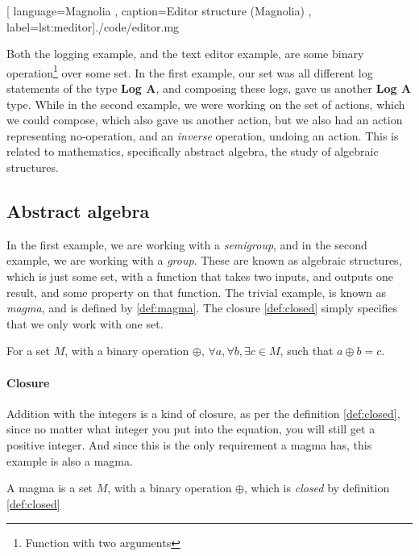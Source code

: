 \begin{code}[H]
  
    [ language=Magnolia
    , caption={Editor structure (Magnolia)}
    , label=lst:meditor]{./code/editor.mg}
\end{code}

Both the logging example, and the text editor example, are some binary operation\footnote{Function with two arguments}
over some set. In the first example, our set was all different log statements of
the type \textbf{Log A}, and composing these logs, gave us another
\textbf{Log A} type. While in the second example, we were working on the set of
actions, which we could compose, which also gave us another action, but we also
had an action representing no-operation, and an \textit{inverse} operation,
undoing an action. This is related to mathematics, specifically abstract
algebra, the study of algebraic structures.

\subsection{Abstract algebra}

In the first example, we are working with a \textit{semigroup}, and in the
second example, we are working with a \textit{group}. These are known as
algebraic structures, which is just some set, with a function that takes two
inputs, and outputs one result, and some property on that function. The trivial
example, is known as \textit{magma}, and is defined by \ref{def:magma}. The
closure \ref{def:closed} simply specifies that we only work with one set.

\begin{definition}[Closure] \label{def:closed}
  For a set $M$, with a binary operation $\oplus$,
  $\forall a, \forall b, \exists c \in M$, such that
  $a \oplus b = c$.
\end{definition}

\paragraph{Closure} Addition with the integers is a kind of closure, as per the
definition \ref{def:closed}, since no matter what integer you put into the
equation, you will still get a positive integer. And since this is the only
requirement a magma has, this example is also a magma.

\begin{definition}[Magma] \label{def:magma}
  A magma is a set $M$, with a binary operation $\oplus$, which is
  \textit{closed} by definition \ref{def:closed}
\end{definition}

